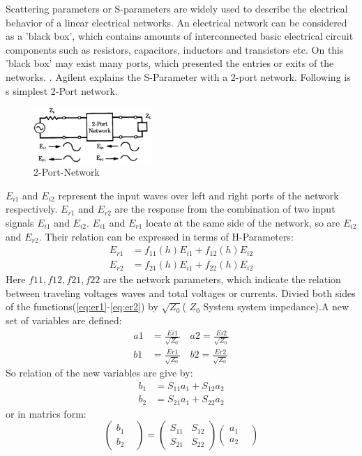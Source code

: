 
Scattering parameters or S-parameters are widely used to describe the electrical behavior of a linear electrical networks. An electrical network can be considered as a 'black box', which contains amounts of interconnected basic electrical circuit components such as  resistors, capacitors, inductors and transistors etc. On this 'black box' may exist many ports, which presented the entries or exits of the networks. 
.
Agilent\cite{aglient_s_parameters} explains the S-Parameter with a 2-port network. Following is s simplest 2-Port network.
\begin{figure}
\includegraphics[width=0.4\textwidth]{bilder/s_parameters}
\caption{2-Port-Network \cite{aglient_s_parameters}}
\label{fig:2_port_network}
\end{figure}
$E_{i1}$ and $E_{i2}$ represent the input waves over left and right ports of the network respectively. $E_{r1}$ and $E_{r2}$ are the response from the combination of two input signals $E_{i1}$ and $E_{i2}$. $E_{i1}$ and $E_{r1}$ locate at the same side of the network, so are $E_{i2}$ and $E_{r2}$. Their relation can  be expressed in terms of H-Parameters: 
\begin{align}
E_{r1}&=f_{11}(h)E_{i1}+f_{12}(h)E_{i2}
\label{eq:er1}
\\
E_{r2}&=f_{21}(h)E_{i1}+f_{22}(h)E_{i2}
\label{eq:er2}
\end{align}
Here $f11,f12,f21,f22$ are the network parameters, which indicate the relation between traveling voltages waves  and total voltages or currents. Divied both sides of the functions(\ref{eq:er1}-\ref{eq:er2}) by $\sqrt{Z_{0}}$( $Z_{0}$ System system impedance).A new set of variables are defined:
\begin{align} 
a1&=\frac{Ei1}{\sqrt{Z_{0}}} \quad a2=\frac{Ei2}{\sqrt{Z_{0}}}\\
b1&=\frac{Er1}{\sqrt{Z_{0}}} \quad b2=\frac{Er2}{\sqrt{Z_{0}}}
\end{align}
So relation of the new variables are give by:
\begin{align}
b_{1}&=S_{11}a_{1}+S_{12}a_{2}\\
b_{2}&=S_{21}a_{1}+S_{22}a_{2}
\end{align}
or in matrics form:
\begin{equation}
		\begin{pmatrix}
			b_{1}&\\
			b_{2}&
		\end{pmatrix}
	=	
		\begin{pmatrix}
			S_{11}&S_{12}\\
			S_{21}&S_{22}
		\end{pmatrix}
		\begin{pmatrix}
			a_{1}&\\
			a_{2}&
		\end{pmatrix}
\label{eq:s_matrix}
\end{equation}

